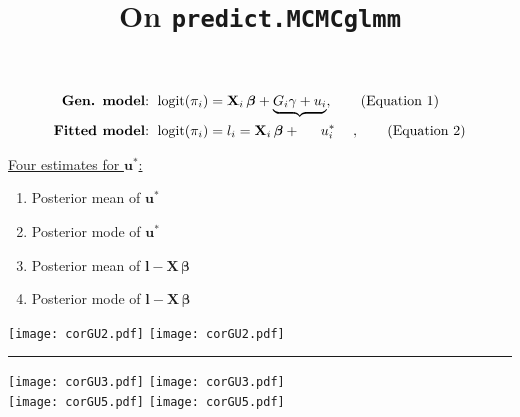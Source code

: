 \documentclass[11pt,a4paper,english]{article}
\title{On \texttt{predict.MCMCglmm}}
\date{\vspace{-7ex}}
\DeclareMathOperator*{\logit}{\text{logit}}
\newcommand\numberthis{\stepcounter{equation}{}\tag{Equation \theequation}}
\begin{document}
\maketitle


\begin{align*}
\text{{\bf Gen. model}:  }\logit(\pi_i) &=  \textbf{X}_i\,\boldsymbol{\beta} + \underbrace{G_i\gamma+ u_i},\numberthis\\
\text{{\bf Fitted model}:  }\logit(\pi_i) &= l_i =\textbf{X}_i\,\boldsymbol{\beta} +\,\;\quad u^*_i\;\quad, \numberthis
\end{align*}

\underline{Four estimates for $ \mathbf{u}^*$:}
\begin{enumerate}
\item Posterior mean of $ \mathbf{u}^*$
\item Posterior mode of $ \mathbf{u}^*$
\item Posterior mean of $ \mathbf{l} -\textbf{X}\,\boldsymbol{\beta}$
\item Posterior mode of $ \mathbf{l} -\textbf{X}\,\boldsymbol{\beta}$
\end{enumerate}

\texttt{[image: corGU2.pdf]}
\texttt{[image: corGU2.pdf]}\\
\begin{center}
\noindent\rule{8cm}{0.4pt}
\end{center}

\texttt{[image: corGU3.pdf]}
\texttt{[image: corGU3.pdf]}\\


\texttt{[image: corGU5.pdf]}
\texttt{[image: corGU5.pdf]}\\
\end{document}
